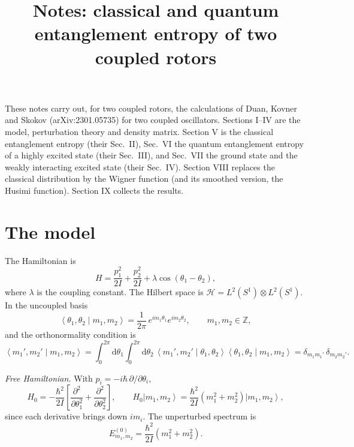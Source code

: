 \documentclass[aps,pra,onecolumn,notitlepage,nofootinbib,11pt]{revtex4-2}
\newcommand{\ket}[1]{\left|#1\right\rangle}
\newcommand{\braket}[2]{\left\langle#1\middle|#2\right\rangle}
\newcommand{\dd}{\mathrm{d}}
\begin{document}
\title{Notes: classical and quantum entanglement entropy of two coupled rotors}
\maketitle

These notes carry out, for two coupled rotors, the calculations of Duan, Kovner and
Skokov (arXiv:2301.05735) for two coupled oscillators. Sections I--IV are the model,
perturbation theory and density matrix. Section V is the classical entanglement
entropy (their Sec.~II), Sec.~VI the quantum entanglement entropy of a highly excited
state (their Sec.~III), and Sec.~VII the ground state and the weakly interacting
excited state (their Sec.~IV). Section VIII replaces the classical distribution by the Wigner function
(and its smoothed version, the Husimi function). Section IX collects the results.

\section{The model}

The Hamiltonian is
\begin{equation}
H=\frac{p_{1}^{2}}{2I}+\frac{p_{2}^{2}}{2I}+\lambda\cos(\theta_{1}-\theta_{2}),
\label{eq:H}
\end{equation}
where $\lambda$ is the coupling constant. The Hilbert space is
$\mathcal{H}=L^{2}(S^{1})\otimes L^{2}(S^{1})$. In the uncoupled basis
\begin{equation}
\braket{\theta_{1},\theta_{2}}{m_{1},m_{2}}=\frac{1}{2\pi}\,e^{im_{1}\theta_{1}}
e^{im_{2}\theta_{2}},\qquad m_{1},m_{2}\in\mathbb{Z},
\label{eq:basis}
\end{equation}
and the orthonormality condition is
\begin{equation}
\braket{m_{1}',m_{2}'}{m_{1},m_{2}}=\int_{0}^{2\pi}\!\!\dd\theta_{1}\int_{0}^{2\pi}\!\!
\dd\theta_{2}\,\braket{m_{1}',m_{2}'}{\theta_{1},\theta_{2}}
\braket{\theta_{1},\theta_{2}}{m_{1},m_{2}}=\delta_{m_{1}m_{1}'}\,\delta_{m_{2}m_{2}'} .
\end{equation}

\emph{Free Hamiltonian.} With $p_{i}=-i\hbar\,\partial/\partial\theta_{i}$,
\begin{equation}
H_{0}=-\frac{\hbar^{2}}{2I}\left[\frac{\partial^{2}}{\partial\theta_{1}^{2}}
+\frac{\partial^{2}}{\partial\theta_{2}^{2}}\right],\qquad
H_{0}\ket{m_{1},m_{2}}=\frac{\hbar^{2}}{2I}\left(m_{1}^{2}+m_{2}^{2}\right)\ket{m_{1},m_{2}},
\end{equation}
since each derivative brings down $im_{i}$. The unperturbed spectrum is
\begin{equation}
E^{(0)}_{m_{1},m_{2}}=\frac{\hbar^{2}}{2I}\left(m_{1}^{2}+m_{2}^{2}\right).
\label{eq:E0}
\end{equation}
\end{document}
